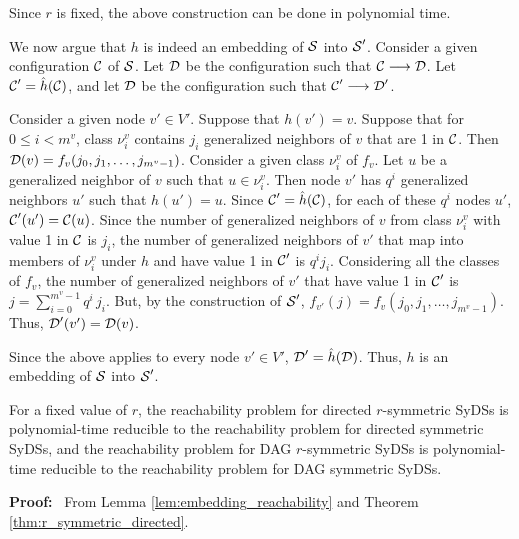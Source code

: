 Since $r$ is fixed, the above construction can be done in polynomial time.

We now argue that $h$ is indeed an embedding of $\mbox{$\mathcal{S}$}$ into $\mbox{$\mathcal{S}$}'$.
Consider a given configuration $\mbox{$\mathcal{C}$}$ of $\mbox{$\mathcal{S}$}$.
Let $\mbox{$\mathcal{D}$}$  be the configuration such that $\mbox{$\mathcal{C}$} \longrightarrow \mbox{$\mathcal{D}$}$.
Let $\mbox{$\mathcal{C}$}' =\hat{h}(\mbox{$\mathcal{C}$})$, 
and let $\mbox{$\mathcal{D}$}$  be the configuration such that $\mbox{$\mathcal{C}$}' \longrightarrow \mbox{$\mathcal{D}$}'$.

Consider a given node $v' \in V'$.
Suppose that $h(v') = v$.
Suppose that for $0 \leq i < m^v$,
class $\nu_i^v$ contains $j_i$ generalized neighbors of $v$ that are 1 in $\mbox{$\mathcal{C}$}$.
Then $\mbox{$\mathcal{D}$}(v) = f_v(j_0,  j_1, \ldots , j_{m^v -1})$.
Consider a given class $\nu_i^v$ of $f_v$.
Let $u$ be a generalized neighbor of $v$ such that $ u \in \nu_i^v$.
Then node $v'$ has $q^i$ generalized neighbors $u'$ such that $h(u') = u$.
Since $\mbox{$\mathcal{C}$}' =\hat{h}(\mbox{$\mathcal{C}$})$, for each of these $q^i$ nodes $u'$,
$\mbox{$\mathcal{C}$}'(u') = \mbox{$\mathcal{C}$}(u)$.
Since the number of generalized neighbors of $v$ from class $\nu_i^v$ 
with value 1 in $\mbox{$\mathcal{C}$}$ is $j_i$,
the number of generalized neighbors of $v'$ 
that map into members of $\nu_i^v$ under $h$ and have value 1 in $\mbox{$\mathcal{C}$}'$ is $q^i j_i$.
Considering all the classes of $f_v$,
the number of generalized neighbors of $v'$ that have value 1 in $\mbox{$\mathcal{C}$}'$ is 
$j = \sum_{i=0}^{m^v-1} q^i \, j_i$.
But, by the construction of $\mbox{$\mathcal{S}$}'$,
$f_{v'}(j) = f_v(j_0,  j_1, \ldots , j_{m^v -1})$.
Thus, $\mbox{$\mathcal{D}$}'(v') = \mbox{$\mathcal{D}$}(v)$.

Since the above applies to every node $v' \in V'$,  $\mbox{$\mathcal{D}$}' =\hat{h}(\mbox{$\mathcal{D}$})$.
Thus, $h$ is an embedding of $\mbox{$\mathcal{S}$}$ into $\mbox{$\mathcal{S}$}'$.
\QED
\fi

\begin{corollary}\label{cor:reachability_symmetric}
For a fixed value of $r$, the reachability problem for directed $r$-symmetric  SyDSs 
is polynomial-time reducible to the reachability problem for directed symmetric SyDSs,
and  the reachability problem for DAG $r$-symmetric  SyDSs 
is polynomial-time reducible to the reachability problem for DAG  symmetric  SyDSs.
\end{corollary}
\noindent
\textbf{Proof:}~ 
From Lemma \ref{lem:embedding_reachability} and Theorem  \ref{thm:r_symmetric_directed}.
\QED

